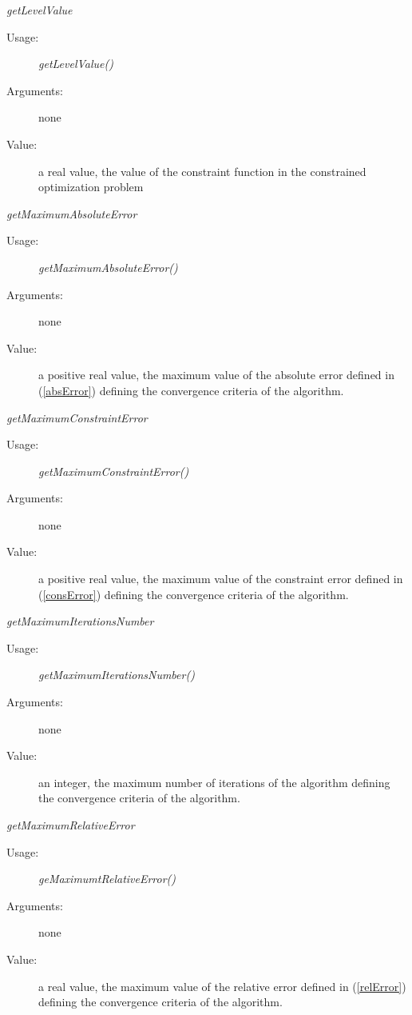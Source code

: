 \begin{description}
\begin{description}
  \item \textit{getLevelValue}
    \begin{description}
    \item[Usage:] \textit{getLevelValue()}
    \item[Arguments:] none
    \item[Value:]  a real value, the value of the constraint function in the constrained optimization problem
    \end{description}
    \bigskip

  \item \textit{getMaximumAbsoluteError}
    \begin{description}
    \item[Usage:] \textit{getMaximumAbsoluteError()}
    \item[Arguments:] none
    \item[Value:] a positive real value, the maximum value of the absolute  error defined in (\ref{absError}) defining the convergence criteria of the algorithm.
    \end{description}
    \bigskip

  \item \textit{getMaximumConstraintError}
    \begin{description}
    \item[Usage:] \textit{getMaximumConstraintError()}
    \item[Arguments:] none
    \item[Value:] a positive real value, the maximum value of the constraint error defined in (\ref{consError}) defining the convergence criteria of the algorithm.
    \end{description}
    \bigskip

  \item \textit{getMaximumIterationsNumber}
    \begin{description}
    \item[Usage:] \textit{getMaximumIterationsNumber()}
    \item[Arguments:] none
    \item[Value:] an integer, the maximum number of iterations of the algorithm defining the convergence criteria  of the algorithm.
    \end{description}
    \bigskip

  \item \textit{getMaximumRelativeError}
    \begin{description}
    \item[Usage:] \textit{geMaximumtRelativeError()}
    \item[Arguments:] none
    \item[Value:] a real value, the maximum value of the relative  error defined in (\ref{relError}) defining the convergence criteria of the algorithm. 
    \end{description}
    \bigskip


\end{description}
\end{description}
